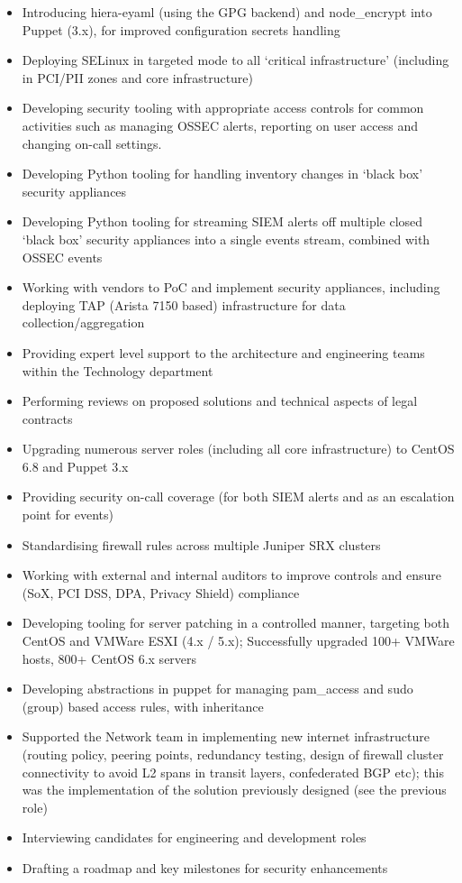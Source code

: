 \begin{itemize}
\tightlist
\item
  Introducing hiera-eyaml (using the GPG backend) and node\_encrypt into
  Puppet (3.x), for improved configuration secrets handling
\item
  Deploying SELinux in targeted mode to all `critical infrastructure'
  (including in PCI/PII zones and core infrastructure)
\item
  Developing security tooling with appropriate access controls for
  common activities such as managing OSSEC alerts, reporting on user
  access and changing on-call settings.
\item
  Developing Python tooling for handling inventory changes in `black
  box' security appliances
\item
  Developing Python tooling for streaming SIEM alerts off multiple
  closed `black box' security appliances into a single events stream,
  combined with OSSEC events
\item
  Working with vendors to PoC and implement security appliances,
  including deploying TAP (Arista 7150 based) infrastructure for data
  collection/aggregation
\item
  Providing expert level support to the architecture and engineering
  teams within the Technology department
\item
  Performing reviews on proposed solutions and technical aspects of
  legal contracts
\item
  Upgrading numerous server roles (including all core infrastructure) to
  CentOS 6.8 and Puppet 3.x
\item
  Providing security on-call coverage (for both SIEM alerts and as an
  escalation point for events)
\item
  Standardising firewall rules across multiple Juniper SRX clusters
\item
  Working with external and internal auditors to improve controls and
  ensure (SoX, PCI DSS, DPA, Privacy Shield) compliance
\item
  Developing tooling for server patching in a controlled manner,
  targeting both CentOS and VMWare ESXI (4.x / 5.x); Successfully
  upgraded 100+ VMWare hosts, 800+ CentOS 6.x servers
\item
  Developing abstractions in puppet for managing pam\_access and sudo
  (group) based access rules, with inheritance
\item
  Supported the Network team in implementing new internet infrastructure
  (routing policy, peering points, redundancy testing, design of
  firewall cluster connectivity to avoid L2 spans in transit layers,
  confederated BGP etc); this was the implementation of the solution
  previously designed (see the previous role)
\item
  Interviewing candidates for engineering and development roles
\item
  Drafting a roadmap and key milestones for security enhancements
\end{itemize}

